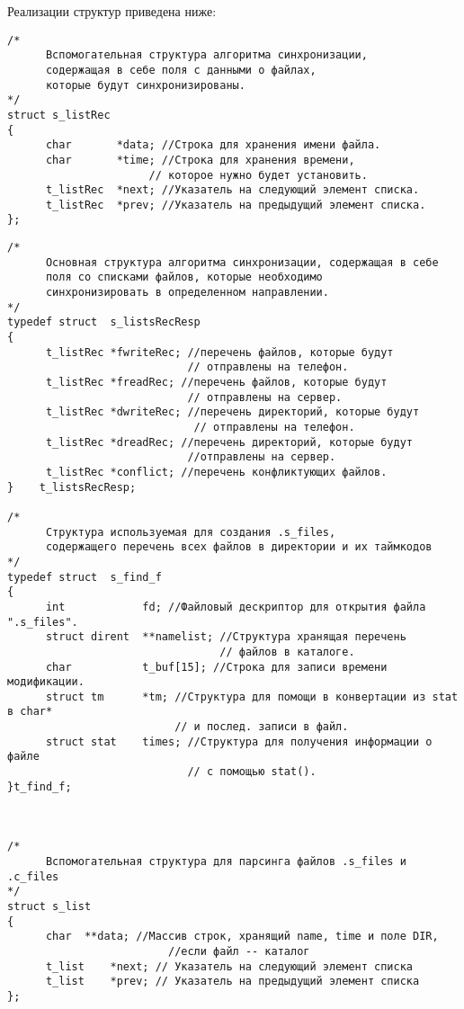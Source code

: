 Реализации структур приведена ниже:
\begin{verbatim}
/*
      Вспомогательная структура алгоритма синхронизации,
      содержащая в себе поля с данными о файлах,
      которые будут синхронизированы.
*/
struct s_listRec
{
      char       *data; //Строка для хранения имени файла.
      char       *time; //Строка для хранения времени,
	                  // которое нужно будет установить.
      t_listRec  *next; //Указатель на следующий элемент списка.
      t_listRec  *prev; //Указатель на предыдущий элемент списка.
};
\end{verbatim}
\newpage
\begin{verbatim}
/*
      Основная структура алгоритма синхронизации, содержащая в себе
      поля со списками файлов, которые необходимо 
      синхронизировать в определенном направлении.
*/
typedef struct	s_listsRecResp
{
      t_listRec	*fwriteRec; //перечень файлов, которые будут
      	                    // отправлены на телефон.
      t_listRec	*freadRec; //перечень файлов, которые будут
      	                    // отправлены на сервер.
      t_listRec	*dwriteRec; //перечень директорий, которые будут
      	                     // отправлены на телефон.
      t_listRec	*dreadRec; //перечень директорий, которые будут
      	                    //отправлены на сервер.
      t_listRec	*conflict; //перечень конфликтующих файлов.
}    t_listsRecResp;

/*
      Структура используемая для создания .s_files,
      содержащего перечень всех файлов в директории и их таймкодов
*/
typedef struct	s_find_f
{
      int            fd; //Файловый дескриптор для открытия файла ".s_files".
      struct dirent  **namelist; //Структура хранящая перечень
                                 // файлов в каталоге.
      char           t_buf[15]; //Строка для записи времени модификации.
      struct tm      *tm; //Структура для помощи в конвертации из stat в char*
                          // и послед. записи в файл.
      struct stat    times; //Структура для получения информации о файле
                            // с помощью stat().
}t_find_f;
	
	

/*
      Вспомогательная структура для парсинга файлов .s_files и .c_files
*/
struct s_list
{
      char	**data; //Массив строк, хранящий name, time и поле DIR,
                         //если файл -- каталог
      t_list	*next; // Указатель на следующий элемент списка
      t_list	*prev; // Указатель на предыдущий элемент списка
};
	

\end{verbatim}
